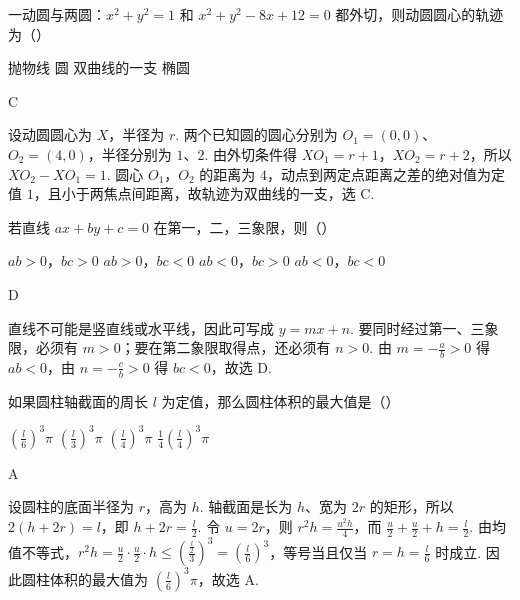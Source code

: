 \begin{problem}
一动圆与两圆：\(x^2 + y^2 = 1\) 和 \(x^2 + y^2 - 8x + 12 = 0\) 都外切，则动圆圆心的轨迹为（\quad）

\choices
    {抛物线}
    {圆}
    {双曲线的一支}
    {椭圆}
\end{problem}

\begin{answer}
C
\end{answer}

\begin{solution}
设动圆圆心为 \(X\)，半径为 \(r\). 两个已知圆的圆心分别为 \(O_1=(0,0)\)、\(O_2=(4,0)\)，半径分别为 \(1\)、\(2\). 由外切条件得 \(XO_1=r+1\)，\(XO_2=r+2\)，所以 \(XO_2-XO_1=1\). 圆心 \(O_1\)，\(O_2\) 的距离为 \(4\)，动点到两定点距离之差的绝对值为定值 \(1\)，且小于两焦点间距离，故轨迹为双曲线的一支，选 C.
\end{solution}

\begin{problem}
若直线 \(ax + by + c = 0\) 在第一，二，三象限，则（\quad）

\choices
    {\(ab > 0\)，\(bc > 0\)}
    {\(ab > 0\)，\(bc < 0\)}
    {\(ab < 0\)，\(bc > 0\)}
    {\(ab < 0\)，\(bc < 0\)}
\end{problem}

\begin{answer}
D
\end{answer}

\begin{solution}
直线不可能是竖直线或水平线，因此可写成 \(y=mx+n\). 要同时经过第一、三象限，必须有 \(m>0\)；要在第二象限取得点，还必须有 \(n>0\). 由 \(m=-\frac{a}{b}>0\) 得 \(ab<0\)，由 \(n=-\frac{c}{b}>0\) 得 \(bc<0\)，故选 D.
\end{solution}

\begin{problem}
如果圆柱轴截面的周长 \(l\) 为定值，那么圆柱体积的最大值是（\quad）

\choices
    {\(\left(\frac{l}{6}\right)^3\pi\)}
    {\(\left(\frac{l}{3}\right)^3\pi\)}
    {\(\left(\frac{l}{4}\right)^3\pi\)}
    {\(\frac{1}{4}\left(\frac{l}{4}\right)^3\pi\)}
\end{problem}

\begin{answer}
A
\end{answer}

\begin{solution}
设圆柱的底面半径为 \(r\)，高为 \(h\). 轴截面是长为 \(h\)、宽为 \(2r\) 的矩形，所以 \(2(h+2r)=l\)，即 \(h+2r=\frac{l}{2}\). 令 \(u=2r\)，则 \(r^2h=\frac{u^2h}{4}\)，而 \(\frac{u}{2}+\frac{u}{2}+h=\frac{l}{2}\). 由均值不等式，\(\displaystyle r^2h=\frac{u}{2}\cdot\frac{u}{2}\cdot h\leqslant\left(\frac{\frac{l}{2}}{3}\right)^3=\left(\frac{l}{6}\right)^3\)，等号当且仅当 \(r=h=\frac{l}{6}\) 时成立. 因此圆柱体积的最大值为 \(\left(\frac{l}{6}\right)^3\pi\)，故选 A.
\end{solution}

